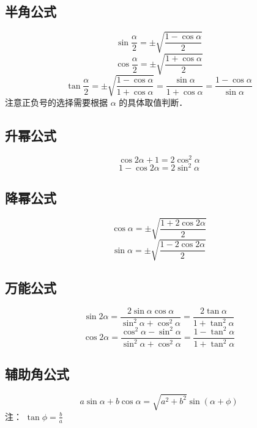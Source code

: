 \subsection{半角公式}
\begin{equation}
\sin\frac{\alpha}{2} = \pm\sqrt{\frac{1-\cos\alpha}{2}}
\end{equation}
\begin{equation}
\cos\frac{\alpha}{2}= \pm\sqrt{\frac{1+\cos\alpha}{2}}
\end{equation}
\begin{equation}
\tan\frac{\alpha}{2} = \pm\sqrt{\frac{1-\cos\alpha}{1+\cos\alpha}} = \frac{\sin\alpha}{1+\cos\alpha} = \frac{1-\cos\alpha}{\sin\alpha}
\end{equation}
注意正负号的选择需要根据 $\alpha$ 的具体取值判断．

\subsection{升幂公式}
\begin{equation}
\cos2\alpha + 1 = 2\cos^2\alpha
\end{equation}
\begin{equation}
1-\cos2\alpha = 2\sin^2\alpha
\end{equation}

\subsection{降幂公式}
\begin{equation}
\cos\alpha = \pm\sqrt{\frac{1+2\cos2\alpha}{2}}
\end{equation}
\begin{equation}
\sin\alpha = \pm\sqrt{\frac{1-2\cos2\alpha}{2}}
\end{equation}

\subsection{万能公式}
\begin{equation}
\sin2\alpha = \frac{2\sin\alpha \cos\alpha}{\sin^2\alpha + \cos^2\alpha} = \frac{2\tan\alpha}{1+\tan^2\alpha}
\end{equation}
\begin{equation}
\cos2\alpha = \frac{\cos^2\alpha-\sin^2\alpha}{\sin^2\alpha+\cos^2\alpha} = \frac{1-\tan^2\alpha}{1+\tan^2\alpha}
\end{equation}

\subsection{辅助角公式}
\begin{equation}
a\sin\alpha + b\cos\alpha = \sqrt{a^2+b^2}\sin(\alpha + \phi)
\end{equation}
注： $\tan\phi = \frac{b}{a}$


